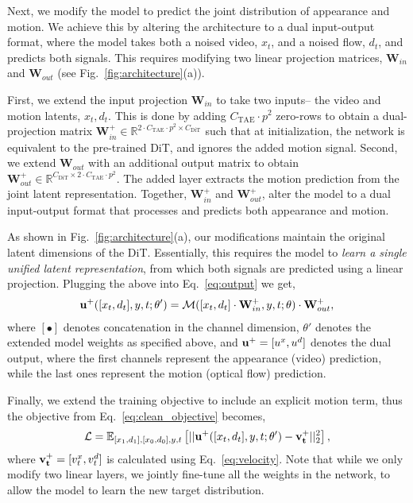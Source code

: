 Next, we modify the model to predict the joint distribution of appearance and motion. We achieve this by altering the architecture to a dual input-output format, where the model takes both a noised video, $x_t$, and a noised flow, $d_t$, and predicts both signals. This requires modifying two linear projection matrices,  $\textbf{W}_{in}$ and $\textbf{W}_{out}$ (see Fig.~\ref{fig:architecture}(a)). 

First, we extend the input projection $\textbf{W}_{in}$ to take two inputs-- the video and motion latents, $x_t, d_t$. This is done by adding $C_{\text{TAE}}\cdot p^2$ zero-rows to obtain a dual-projection matrix $\textbf{W}^+_{in}\in \mathbb{R}^{2\cdot C_{\text{TAE}}\cdot p^2\times C_{\text{DiT}}}$ such that at initialization, the network is equivalent to the pre-trained DiT, and ignores the added motion signal.
Second, we extend $\textbf{W}_{out}$ with an additional output matrix to obtain $\textbf{W}^+_{out}\in \mathbb{R}^{C_{\text{DiT}}\times 2\cdot C_{\text{TAE}}\cdot p^2}$. The added layer extracts the motion prediction from the joint latent representation.
Together, $\textbf{W}^+_{in}$ and $\textbf{W}^+_{out}$, alter the model to a dual input-output format that processes and predicts both appearance and motion. 

As shown in Fig.~\ref{fig:architecture}(a), our modifications maintain the original latent dimensions of the DiT. Essentially, this requires the model to \emph{learn a single unified latent representation}, from which both signals are predicted using a linear projection. Plugging the above into Eq.~\ref{eq:output} we get, 
\begin{align*}
     \bold{u^+}([x_t, d_t], y, t; \theta') = \mathcal{M}([x_t,d_t] \cdot \textbf{W}^+_{in}, y, t; \theta) \cdot \textbf{W}^+_{out},
\end{align*}
where $[\bullet]$ denotes concatenation in the channel dimension, $\theta'$ denotes the extended model weights as specified above, and $\bold{u^+}=[u^x, u^{d}]$ denotes the dual output, where the first channels represent the appearance (video) prediction, while the last ones represent the motion (optical flow) prediction. 

Finally, we extend the training objective to include an explicit motion term, thus the objective from Eq.~\ref{eq:clean_objective} becomes,
\begin{equation}
    \mathcal{L} = \mathbb{E}_{[x_1,d_1],[x_0,d_0],y,t} \left [ || \bold{u^+}([x_t, d_t], y, t; \theta') - \bold{v^+_t} ||_2^2 \right ],
    \label{eq:objective}
\end{equation}
where $\bold{v^+_t}=[v^x_t, v^{d}_t]$ is calculated using Eq.~\ref{eq:velocity}. Note that while we only modify two linear layers, we jointly fine-tune all the weights in the network, to allow the model to learn the new target distribution.

